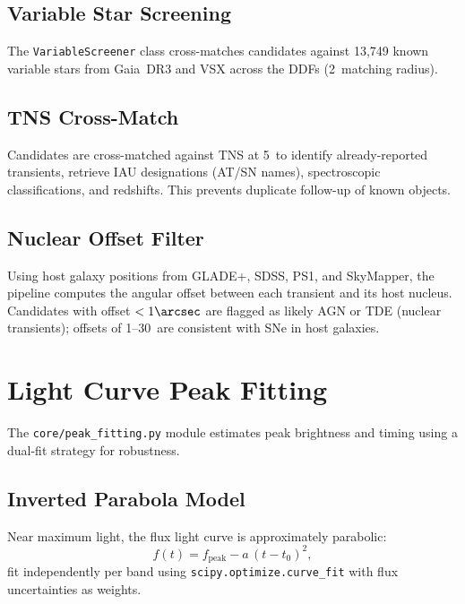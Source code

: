 \documentclass[11pt,letterpaper]{article}
\begin{document}
\subsection{Variable Star Screening}

The \texttt{VariableScreener} class cross-matches candidates against
13{,}749 known variable stars from Gaia~DR3 and VSX across the DDFs
(2\arcsec\ matching radius).

\subsection{TNS Cross-Match}

Candidates are cross-matched against TNS at 5\arcsec\ to identify
already-reported transients, retrieve IAU designations (AT/SN names),
spectroscopic classifications, and redshifts.  This prevents duplicate
follow-up of known objects.

\subsection{Nuclear Offset Filter}

Using host galaxy positions from GLADE+, SDSS, PS1, and SkyMapper, the
pipeline computes the angular offset between each transient and its host
nucleus.  Candidates with offset $< 1\arcsec$ are flagged as likely
AGN or TDE (nuclear transients); offsets of 1--30\arcsec\ are consistent
with SNe in host galaxies.


\section{Light Curve Peak Fitting}
\label{sec:peak_fitting}

The \texttt{core/peak\_fitting.py} module estimates peak brightness
and timing using a dual-fit strategy for robustness.

\subsection{Inverted Parabola Model}

Near maximum light, the flux light curve is approximately parabolic:
\begin{equation}
f(t) = f_{\mathrm{peak}} - a\,(t - t_0)^2,
\end{equation}
fit independently per band using \texttt{scipy.optimize.curve\_fit}
with flux uncertainties as weights.
\end{document}
